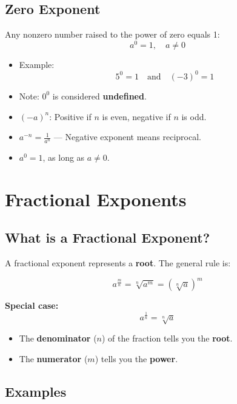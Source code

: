 \documentclass[11pt]{article}
\begin{document}
\subsection*{Zero Exponent}

Any nonzero number raised to the power of zero equals 1:
\[
a^0 = 1, \quad a \neq 0
\]
\begin{itemize}
  \item Example:
    \[
    5^0 = 1 \quad\text{and}\quad (-3)^0 = 1
    \]
  \item Note: \( 0^0 \) is considered \textbf{undefined}.
\end{itemize}

\begin{tcolorbox}[colback=yellow!5!white, colframe=yellow!80!black, title=Exponent Rules Summary]
\begin{itemize}
  \item \( (-a)^n \): Positive if \( n \) is even, negative if \( n \) is odd.
  \item \( a^{-n} = \frac{1}{a^n} \) — Negative exponent means reciprocal.
  \item \( a^0 = 1 \), as long as \( a \neq 0 \).
\end{itemize}
\end{tcolorbox}

\section{Fractional Exponents}

\subsection*{What is a Fractional Exponent?}

A fractional exponent represents a \textbf{root}. The general rule is:

\[
a^{\frac{m}{n}} = \sqrt[n]{a^m} = \left( \sqrt[n]{a} \right)^m
\]

\textbf{Special case:}
\[
a^{\frac{1}{n}} = \sqrt[n]{a}
\]

\begin{itemize}
  \item The \textbf{denominator} (\( n \)) of the fraction tells you the \textbf{root}.
  \item The \textbf{numerator} (\( m \)) tells you the \textbf{power}.
\end{itemize}

\subsection*{Examples}
\end{document}
